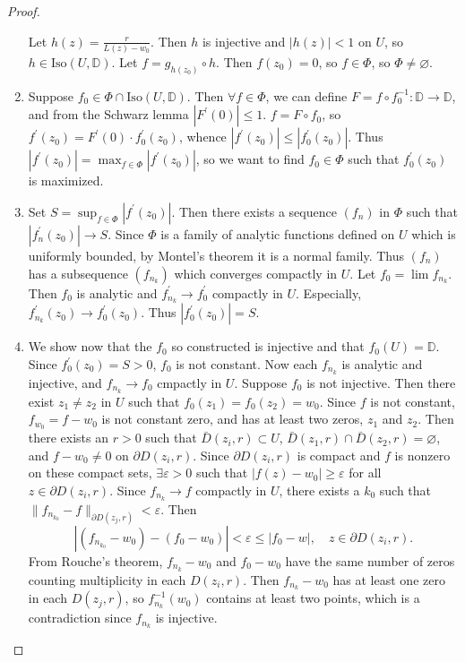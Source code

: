 \begin{proof}
\begin{enumerate}
{    Let $h(z) = \frac{r}{L(z) - w_0}$. Then $h$ is injective and
    $|h(z)| < 1$ on $U$, so
    $h \in \mathrm{Iso}(U, \mathbb{D})$.
    Let $f = g_{h(z_0)} \circ h$. Then $f(z_0) = 0$, so $f \in \Phi$,
    so $\Phi \neq \varnothing$.
  }
  \item{
    Suppose $f_0 \in \Phi \cap \mathrm{Iso}(U, \mathbb{D})$. Then
    $\forall f \in \Phi$, we can define
    $F = f \circ f_0^{-1} : \mathbb{D} \to \mathbb{D}$, and from
    the Schwarz lemma $|F^\prime(0)| \leq 1$.
    $f = F \circ f_0$, so
    $f^\prime(z_0) = F^\prime(0) \cdot f_0^\prime(z_0)$, whence
    $|f^\prime(z_0)| \leq |f_0^\prime(z_0)|$. Thus
    $|f^\prime(z_0)| = \max_{f \in \Phi} |f^\prime(z_0)|$, so we
    want to find $f_0 \in \Phi$ such that $f_0^\prime(z_0)$ is
    maximized.
  }
  \item{
    Set $S = \sup_{f \in \Phi} |f^\prime(z_0)|$. Then there exists a
    sequence $(f_n)$ in $\Phi$ such that $|f_n^\prime(z_0)| \to S$.
    Since $\Phi$ is a family of analytic functions defined on $U$
    which is uniformly bounded, by Montel's theorem it is a
    normal family. Thus $(f_n)$ has a subsequence $(f_{n_k})$ which
    converges compactly in $U$. Let $f_0 = \lim f_{n_k}$. Then
    $f_0$ is analytic and $f_{n_k}^\prime \to f_0^\prime$ compactly
    in $U$. Especially, $f_{n_k}^\prime(z_0) \to f_0^\prime(z_0)$.
    Thus $|f_0^\prime(z_0)| = S$.
  }
  \item{
    We show now that the $f_0$ so constructed is injective and that
    $f_0(U) = \mathbb{D}$. Since $f_0^\prime(z_0) = S > 0$, $f_0$ is
    not constant. Now each $f_{n_k}$ is analytic and injective, and
    $f_{n_k} \to f_0$ cmpactly in $U$. Suppose $f_0$ is not injective.
    Then there exist $z_1 \neq z_2$ in $U$ such that
    $f_0(z_1) = f_0(z_2) = w_0$. Since $f$ is not constant,
    $f_{w_0} = f - w_0$ is not constant zero, and has at least two
    zeros, $z_1$ and $z_2$. Then there exists an $r > 0$ such that
    $\bar{D}(z_i, r) \subset U$,
    $\bar{D}(z_1, r) \cap \bar{D}(z_2, r) = \varnothing$, and
    $f - w_0 \neq 0$ on $\partial D(z_i, r)$. Since
    $\partial D(z_i, r)$ is compact and $f$ is nonzero on these
    compact sets, $\exists \varepsilon > 0$ such that
    $|f(z) - w_0| \geq \varepsilon$ for all
    $z \in \partial D(z_i, r)$. Since $f_{n_k} \to f$ compactly in
    $U$, there exists a $k_0$ such that
    $\|f_{n_{k_0}} - f\|_{\partial D(z_j, r)} < \varepsilon$. Then
    $$
         |(f_{n_{k_0}} - w_0) - (f_0 - w_0)|
    <    \varepsilon
    \leq |f_0 - w|, \quad z \in \partial D(z_i, r).
    $$
    From Rouche's theorem, $f_{n_k} - w_0$ and
    $f_0 - w_0$ have the same number of zeros counting multiplicity
    in each $D(z_i, r)$. Then $f_{n_k} - w_0$ has at least one zero
    in each $D(z_j, r)$, so $f_{n_k}^{-1}(w_0)$ contains at least two
    points, which is a contradiction since $f_{n_k}$ is injective.
  }
\end{enumerate}

\end{proof}
